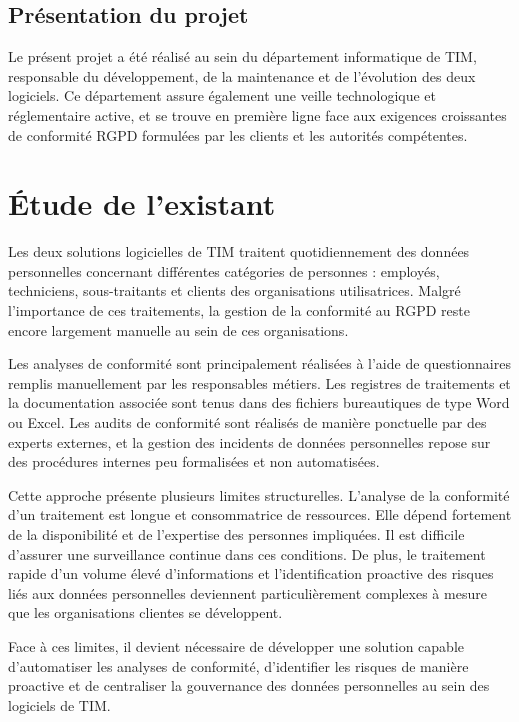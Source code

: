 \documentclass[12pt,a4paper]{report}
\begin{document}
\subsection{Présentation du projet}

Le présent projet a été réalisé au sein du département informatique de TIM, responsable du développement, de la maintenance et de l'évolution des deux logiciels. Ce département assure également une veille technologique et réglementaire active, et se trouve en première ligne face aux exigences croissantes de conformité RGPD formulées par les clients et les autorités compétentes.

\section{Étude de l'existant}

Les deux solutions logicielles de TIM traitent quotidiennement des données personnelles concernant différentes catégories de personnes : employés, techniciens, sous-traitants et clients des organisations utilisatrices. Malgré l'importance de ces traitements, la gestion de la conformité au RGPD reste encore largement manuelle au sein de ces organisations.

Les analyses de conformité sont principalement réalisées à l'aide de questionnaires remplis manuellement par les responsables métiers. Les registres de traitements et la documentation associée sont tenus dans des fichiers bureautiques de type Word ou Excel. Les audits de conformité sont réalisés de manière ponctuelle par des experts externes, et la gestion des incidents de données personnelles repose sur des procédures internes peu formalisées et non automatisées.

Cette approche présente plusieurs limites structurelles. L'analyse de la conformité d'un traitement est longue et consommatrice de ressources. Elle dépend fortement de la disponibilité et de l'expertise des personnes impliquées. Il est difficile d'assurer une surveillance continue dans ces conditions. De plus, le traitement rapide d'un volume élevé d'informations et l'identification proactive des risques liés aux données personnelles deviennent particulièrement complexes à mesure que les organisations clientes se développent.

Face à ces limites, il devient nécessaire de développer une solution capable d'automatiser les analyses de conformité, d'identifier les risques de manière proactive et de centraliser la gouvernance des données personnelles au sein des logiciels de TIM.
\end{document}
